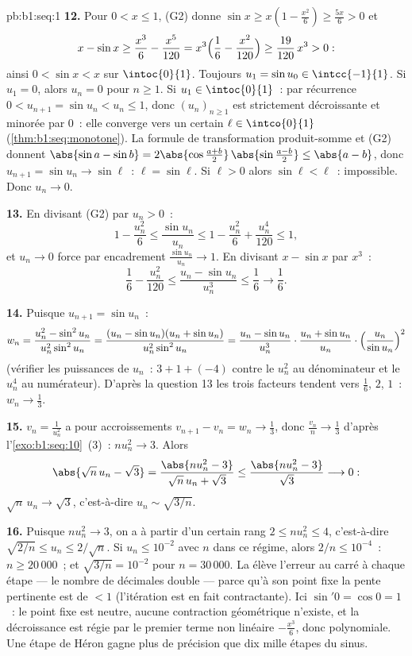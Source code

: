 \begin{solution}{pb:b1:seq:1}
\textbf{12.} Pour $0 < x \leq 1$, (G2) donne $\sin x \geq x(1 -
\frac{x^2}{6}) \geq \frac{5x}{6} > 0$ et
\[
x - \sin x \geq \frac{x^3}{6} - \frac{x^5}{120}
= x^3\Bigl(\frac16 - \frac{x^2}{120}\Bigr)
\geq \frac{19}{120}\,x^3 > 0 :
\]
ainsi $0 < \sin x < x$ sur $\intoc{0}{1}$. Toujours $u_1 = \sin u_0
\in \intcc{-1}{1}$. Si $u_1 = 0$, alors $u_n = 0$ pour $n \geq 1$.
Si $u_1 \in \intoc{0}{1}$~: par récurrence $0 < u_{n+1} = \sin u_n
< u_n \leq 1$, donc $(u_n)_{n\geq1}$ est strictement décroissante et
minorée par $0$~: elle converge vers un certain $\ell \in
\intco{0}{1}$ (\cref{thm:b1:seq:monotone}). La formule de
transformation produit-somme et (G2) donnent $\abs{\sin a - \sin b} =
2\abs{\cos \frac{a+b}{2}}\,\abs{\sin\frac{a-b}{2}} \leq \abs{a - b}$,
donc $u_{n+1} = \sin u_n \to \sin \ell$~: $\ell = \sin\ell$. Si $\ell
> 0$ alors $\sin\ell < \ell$~: impossible. Donc $u_n \to 0$.

\textbf{13.} En divisant (G2) par $u_n > 0$~:
\[
1 - \frac{u_n^2}{6} \leq \frac{\sin u_n}{u_n} \leq 1 -
\frac{u_n^2}{6} + \frac{u_n^4}{120} \leq 1 ,
\]
et $u_n \to 0$ force par encadrement $\frac{\sin u_n}{u_n} \to 1$. En
divisant $x - \sin x$ par $x^3$~:
\[
\frac16 - \frac{u_n^2}{120} \leq \frac{u_n - \sin u_n}{u_n^3}
\leq \frac16 \longrightarrow \frac16 .
\]

\textbf{14.} Puisque $u_{n+1} = \sin u_n$~:
\[
w_n = \frac{u_n^2 - \sin^2 u_n}{u_n^2 \sin^2 u_n}
= \frac{(u_n - \sin u_n)(u_n + \sin u_n)}{u_n^2 \sin^2 u_n}
= \frac{u_n - \sin u_n}{u_n^3}\cdot
\frac{u_n + \sin u_n}{u_n}\cdot
\Bigl(\frac{u_n}{\sin u_n}\Bigr)^{2}
\]
(vérifier les puissances de $u_n$~: $3 + 1 + (-4)$ contre le $u_n^2$
au dénominateur et le $u_n^4$ au numérateur). D'après la question 13
les trois facteurs tendent vers $\frac16$, $2$, $1$~: $w_n \to
\frac13$.

\textbf{15.} $v_n = \frac{1}{u_n^2}$ a pour accroissements $v_{n+1} -
v_n = w_n \to \frac13$, donc $\frac{v_n}{n} \to \frac13$ d'après
l'\cref{exo:b1:seq:10}~(3)~: $n u_n^2 \to 3$. Alors
\[
\abs{\sqrt n\,u_n - \sqrt 3}
= \frac{\abs{n u_n^2 - 3}}{\sqrt n\,u_n + \sqrt 3}
\leq \frac{\abs{n u_n^2 - 3}}{\sqrt 3} \longrightarrow 0 :
\]
$\sqrt n\,u_n \to \sqrt 3$, c'est-à-dire $u_n \sim \sqrt{3/n}$.

\textbf{16.} Puisque $n u_n^2 \to 3$, on a à partir d'un certain rang
$2 \leq n u_n^2 \leq 4$, c'est-à-dire $\sqrt{2/n} \leq u_n \leq
2/\sqrt n$. Si $u_n \leq 10^{-2}$ avec $n$ dans ce régime, alors $2/n
\leq 10^{-4}$~: $n \geq 20\,000$~; et $\sqrt{3/n} = 10^{-2}$ pour $n
= 30\,000$. La  élève l'erreur au carré à chaque étape
--- le nombre de décimales double --- parce qu'à son point fixe la
pente pertinente est de  $< 1$ (l'itération est en fait
contractante). Ici $\sin' 0 = \cos 0 = 1$~: le point fixe est neutre,
aucune contraction géométrique n'existe, et la décroissance est régie
par le premier terme non linéaire $-\frac{x^3}{6}$, donc polynomiale.
Une étape de Héron gagne plus de précision que dix mille étapes du
sinus.


\end{solution}
